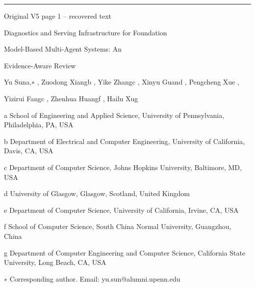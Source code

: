 \par\smallskip\noindent\rule{\textwidth}{0.4pt}\par{\sffamily\footnotesize Original V5 page 1 -- recovered text}\par\begin{flushleft}\footnotesize\ttfamily
\par\smallskip
\par\smallskip
\noindent Diagnostics and Serving Infrastructure for Foundation\par
\noindent  Model-Based Multi-Agent Systems: An\par
\noindent  Evidence-Aware Review\par
\noindent  Yu Suna,∗ , Zuodong Xiangb , Yike Zhangc , Xinyu Guand , Pengcheng Xue ,\par
\noindent  Yizirui Fangc , Zhenhua Huangf , Hailu Xug\par
\noindent  a School of Engineering and Applied Science, University of Pennsylvania, Philadelphia, PA, USA\par
\par\smallskip
\noindent  b Department of Electrical and Computer Engineering, University of California, Davis, CA, USA\par
\par\smallskip
\noindent  c Department of Computer Science, Johns Hopkins University, Baltimore, MD, USA\par
\par\smallskip
\noindent  d University of Glasgow, Glasgow, Scotland, United Kingdom\par
\par\smallskip
\noindent  e Department of Computer Science, University of California, Irvine, CA, USA\par
\par\smallskip
\noindent  f School of Computer Science, South China Normal University, Guangzhou, China\par
\par\smallskip
\noindent  g Department of Computer Engineering and Computer Science, California State University, Long Beach, CA, USA\par
\par\smallskip
\noindent  ∗ Corresponding author. Email: yu.sun@alumni.upenn.edu\par
\par\smallskip
\par\smallskip
\par\smallskip

\end{flushleft}
